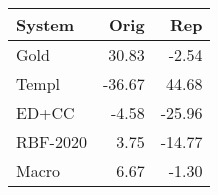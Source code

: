 \begin{tabular}{lrr}
\toprule
System & Orig & Rep \\
\midrule
Gold & 30.83 & -2.54 \\
Templ & -36.67 & 44.68 \\
ED+CC & -4.58 & -25.96 \\
RBF-2020 & 3.75 & -14.77 \\
Macro & 6.67 & -1.30 \\
\bottomrule
\end{tabular}
